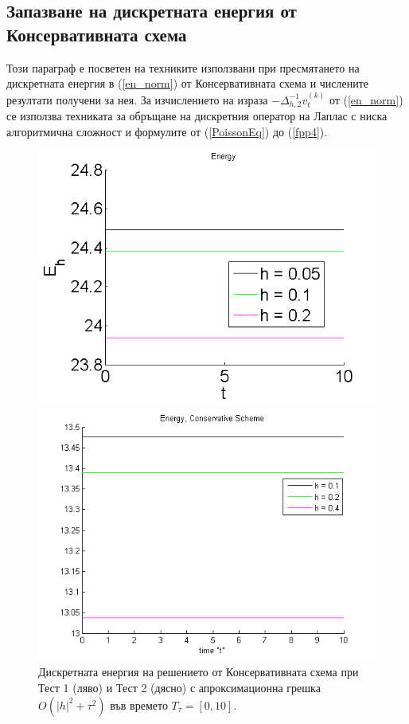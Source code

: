 \documentclass{article}
\newcommand{\rf}[1]{(\ref{#1})}
\begin{document}
\subsection{ Запазване на дискретната енергия от Консервативната схема }
Този параграф е посветен на техниките използвани при пресмятането на дискретната енергия в \rf{en_norm} от Консервативната схема и числените резултати получени за нея. За изчислението на израза $-\Delta_{h,2}^{-1}v_{t}^{(k)}$ от \rf{en_norm} се използва техниката за обръщане на дискретния оператор на Лаплас с ниска алгоритмична сложност и формулите от \rf{PoissonEq} до \rf{fpp4}.
\begin{figure}[ht]\vspace{0.02cm}
	\begin{minipage}[b]{0.48\linewidth}
		\includegraphics[width=\linewidth]{../amitans/figures/Energy_EnergySave_bt3_c045_x3O.png}	
	\end{minipage}
	\begin{minipage}[b]{0.48\linewidth}
		 \includegraphics[width=\linewidth]{../amitans/figures/Energy_EnergySave_bt1_c090_x3O.png}
	\end{minipage}
\caption{Дискретната енергия на решението от Консервативната схема при Тест 1 (ляво) и Тест 2 (дясно) с апроксимационна грешка $O(|h|^2 + \tau^2)$ във времето $T_{\tau} = [0, 10]$.}
\label{EnOnly}
\end{figure}
\end{document}
